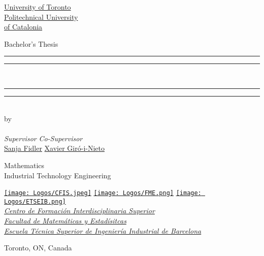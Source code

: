 

\begin{titlepage}
  \makeatletter
  \hypersetup{
    urlcolor = black
  }

  \centering
  \scshape\Large

  \begin{minipage}[c]{.2\textwidth}
    \centering
    
  \end{minipage}\hfill
  \begin{minipage}[c]{.5\textwidth}
    \centering
    \href{https://href.com}{University of Toronto} \\[2ex]
    \href{https://href.com}{Politechnical University \\ of Catalonia}
  \end{minipage}\hfill
  \begin{minipage}[c]{.2\textwidth}
    \centering
    
  \end{minipage}

  \vfill

  Bachelor's Thesis \\[-1.5ex]
  \LARGE
  \rule{\textwidth}{1.6pt}\vspace*{-\baselineskip}\vspace*{2pt}
  \rule{\textwidth}{0.4pt}
  \textbf{\href{https://href.com}{\@title}} \\[-1ex]
  \rule{\textwidth}{0.4pt}\vspace*{-\baselineskip}\vspace*{3.2pt}
  \rule{\textwidth}{1.6pt} \\
  \Large
  by \\
  \LARGE
  \textbf{\href{http://href.com}{\@author}} \\[1ex]
  \large
  \noindent \textsl{Supervisor} \hfill \textsl{Co-Supervisor} \\
  \href{https://href.com}{Sanja Fidler}\hfill
  \href{https://href.com}{Xavier Giró-i-Nieto}

  \vfill

  \Large
  Mathematics \\
  Industrial Technology Engineering

  \vfill

  \large
  \href{https://href.com}{\texttt{[image: Logos/CFIS.jpeg]}}
  \hspace{2em}
  \href{https://href.com}{\texttt{[image: Logos/FME.png]}}
  \hspace{2em}
  \href{https://href.com}{\texttt{[image: Logos/ETSEIB.png]}} \\[1ex]
  {\slshape
  \href{https://href.com}{Centro de Formación Interdisciplinaria Superior} \\
  \href{https://href.com}{Facultad de Matemáticas y Estadísitcas} \\
  \href{https://href.com}{Escuela Técnica Superior de Ingeniería Industrial de Barcelona}}

  \vfill

  Toronto, ON, Canada \hfill \@date

  \makeatother
\end{titlepage}


